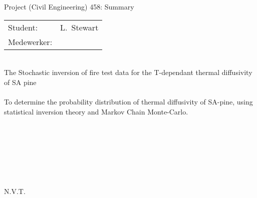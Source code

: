 
\begin{Summary}{Project (Civil Engineering) 458: Summary}

   \noindent
   \begin{tabular}{@{}ll@{}}
      \textsf{Student:}    &  L.\ Stewart\\
      \textsf{Medewerker:} &
   \end{tabular}

\begin{SumTable}
 \hline%
 \\
 \hline%
    The Stochastic inversion of fire test data for the 
    T-dependant thermal diffusivity of SA pine\\

 \hline%
 \\
 \hline%
    To determine the probability distribution of thermal diffusivity of SA-pine, using statistical inversion theory and Markov Chain Monte-Carlo.\\

 \hline%
 \\
 \hline%
   

 \hline%
 \\
 \hline%
  \

 \hline%
 \\
 \hline%
    
 \hline%
 \\
 \hline%
    N.V.T.\\


\end{SumTable}
\end{Summary}
